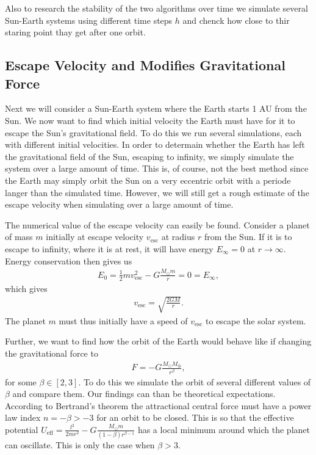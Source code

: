 \documentclass[twocolumn]{aastex62}
\begin{document}
Also to research the stability of the two algorithms over
time we simulate several Sun-Earth systems using different time steps $h$ and
chenck how close to thir staring point thay get after one orbit. 

\subsection{Escape Velocity and Modifies Gravitational Force}\label{sec:modgrav}
Next we will consider a Sun-Earth system where the Earth starts 1 AU from the
Sun. We now want to find which initial velocity the Earth must have for it to
escape the Sun's gravitational field. To do this we run several simulations,
each with different initial velocities. In order to determain whether the Earth
has left the gravitational field of the Sun, escaping to infinity, we simply
simulate the system over a large amount of time. This is, of course, not the
best method since the Earth may simply orbit the Sun on a very eccentric orbit
with a periode langer than the simulated time. However, we will still get a
rough estimate of the escape velocity when simulating over a large amount of time.

The numerical value of the escape velocity can easily be found. Consider a
planet of mass $m$ initially at escape velocity $v_\mathrm{esc}$ at radius $r$
from the Sun. If it is to escape to infinity, where it is at rest, it will have
energy $E_\infty = 0$ at $r\to\infty$. Energy conservation then gives us 
\begin{align}
    E_0 = \frac{1}{2}mv_\mathrm{esc}^2 - G\frac{M_\odot m}{r} = 0 = E_\infty,
\end{align} 
which gives 
\begin{align}\label{eq:v_esc}
    v_\mathrm{esc} = \sqrt{\frac{2GM}{r}}.
\end{align}
The planet $m$ must thus initially have a speed of $v_\mathrm{esc}$ to escape the solar system.

Further, we want to find how the orbit of the Earth would behave like if
changing the gravitational force to 
\begin{align}
    F = -G\frac{M_\odot M_\oplus}{r^\beta},
\end{align}
for some $\beta\in[2, 3]$. To do this we simulate the orbit of several different
values of $\beta$ and compare them. Our findings can than be theoretical
expectations. According to Bertrand's theorem \citep[ch. 3.6]{goldstein:2001} the attractional central
force must have a power law index $n = -\beta > -3$ for an orbit to be closed. This is so
that the effective potential $U_\mathrm{eff} = \frac{l^2}{2mr^2} -
G\frac{M_\odot m}{(1-\beta)r^{\beta - 1}}$ has a local minimum around which the
planet can oscillate. This is only the case when $\beta > 3$.
\end{document}
